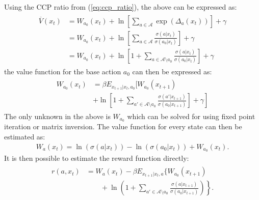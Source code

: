 \documentclass{article}
\begin{document}
Using the CCP ratio from (\ref{eq:ccp_ratio}), the above can be expressed as:
\begin{align} 
\begin{split}
\overline{V}(x_t) &=W_{a_0}(x_t)+\ln\left[\sum_{a\in\mathcal{A}} \exp(\Delta_a(x_t))\right]+\gamma\\
&=W_{a_0}(x_t)+\ln\left[\sum_{a\in\mathcal{A}} \frac{\sigma(a|x_t)}{\sigma(a_0|x_t)}\right]+\gamma\\
&=W_{a_0}(x_t)+\ln\left[1+\sum_{a\in\mathcal{A}\setminus a_0} \frac{\sigma(a|x_t)}{\sigma(a_0|x_t)}\right]+\gamma
\end{split}
\end{align}
the value function for the base action $a_0$ can then be expressed as:
\begin{align}
\begin{split}
W_{a_0}(x_t)&=
 \beta E_{x_{t+1}|x_t,a_0}
\Bigg[W_{a_0}(x_{t+1}) \\
&\left. +\ln\left[1+ \sum_{a'\in\mathcal{A}\setminus a_0}\frac{\sigma(a'|x_{t+1})}{\sigma(a_0|x_{t+1})}\right]+\gamma\right]
\end{split}
\end{align}
The only unknown in the above is $W_{a_0}$ which can be solved for using fixed point iteration or matrix inversion. The value function for every state can then be estimated as:
\begin{eqnarray}
W_a(x_t)=\ln(\sigma(a|x_t))-\ln(\sigma(a_0|x_t))+W_{a_0}(x_t).\label{eq:v_backout}
\end{eqnarray}
It is then possible to estimate the reward function directly:
\begin{align}
\begin{split}
r(a,x_t)
&=W_a(x_t)- \beta E_{x_{t+1}|x_t,a}\Bigg\{
W_{a_0}(x_{t+1})
\\ &\left.\qquad +
\ln
  \left(
    1 + \sum_{a'\in\mathcal{A}\setminus a_0}\frac{\sigma(a|x_{t+1})}{\sigma(a_0|x_{t+1})}
  \right)
\right\}.
\end{split}
\end{align}

\end{document}
